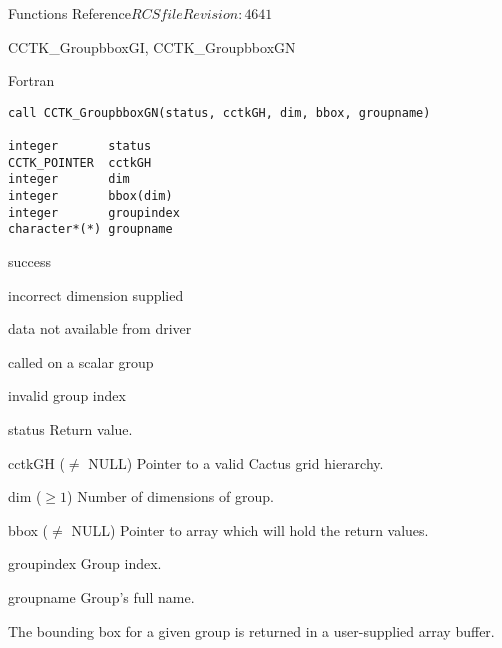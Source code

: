 \begin{cactuspart}{ Functions Reference}{$RCSfile$}{$Revision: 4641 $}
\begin{FunctionDescription}{CCTK\_GroupbboxGI, CCTK\_GroupbboxGN}
\begin{SynopsisSection}
\begin{Synopsis}{Fortran}
\begin{verbatim}
call CCTK_GroupbboxGN(status, cctkGH, dim, bbox, groupname)

integer       status
CCTK_POINTER  cctkGH
integer       dim
integer       bbox(dim)
integer       groupindex
character*(*) groupname
\end{verbatim}
\end{Synopsis}
\end{SynopsisSection}

\begin{ResultSection}
\begin{Result}{0} success \end{Result}
\begin{Result}{-1} incorrect dimension supplied \end{Result}
\begin{Result}{-2} data not available from driver \end{Result}
\begin{Result}{-3} called on a scalar group \end{Result}
\begin{Result}{-4} invalid group index \end{Result}
\end{ResultSection}

\begin{ParameterSection}
\begin{Parameter}{status} Return value. \end{Parameter}
\begin{Parameter}{cctkGH ($\ne$ NULL)} Pointer to a valid Cactus grid hierarchy. \end{Parameter}
\begin{Parameter}{dim ($\ge 1$)} Number of dimensions of group. \end{Parameter}
\begin{Parameter}{bbox ($\ne$ NULL)} Pointer to array which will hold the return values. \end{Parameter}
\begin{Parameter}{groupindex} Group index. \end{Parameter}
\begin{Parameter}{groupname} Group's full name. \end{Parameter}
\end{ParameterSection}

\begin{Discussion}
The bounding box for a given group is returned in a user-supplied array buffer.
\end{Discussion}


\end{FunctionDescription}
\end{cactuspart}
